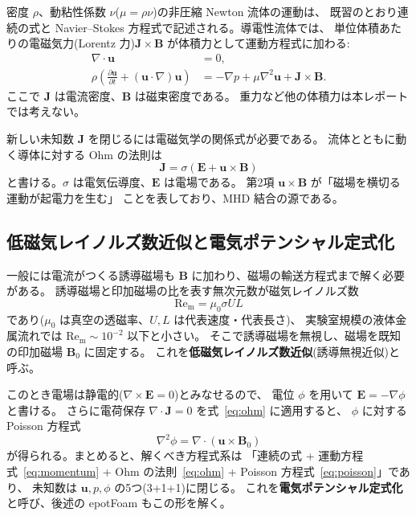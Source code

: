 \documentclass{ltjsarticle}   %
\newcommand{\Rm}{\mathrm{Re}_\mathrm{m}}
\begin{document}
密度 $\rho$、動粘性係数 $\nu$($\mu=\rho\nu$)の非圧縮 Newton 流体の運動は、
既習のとおり連続の式と Navier--Stokes 方程式で記述される。導電性流体では、
単位体積あたりの電磁気力(Lorentz 力)$\boldsymbol{J}\times\boldsymbol{B}$
が体積力として運動方程式に加わる:
\begin{align}
  \nabla\cdot\boldsymbol{u} &= 0, \\
  \rho\left(\frac{\partial \boldsymbol{u}}{\partial t}
    + (\boldsymbol{u}\cdot\nabla)\boldsymbol{u}\right)
  &= -\nabla p + \mu\nabla^2\boldsymbol{u}
    + \boldsymbol{J}\times\boldsymbol{B}.
  \label{eq:momentum}
\end{align}
ここで $\boldsymbol{J}$ は電流密度、$\boldsymbol{B}$ は磁束密度である。
重力など他の体積力は本レポートでは考えない。

新しい未知数 $\boldsymbol{J}$ を閉じるには電磁気学の関係式が必要である。
流体とともに動く導体に対する Ohm の法則は
\begin{equation}
  \boldsymbol{J} = \sigma\left(\boldsymbol{E} + \boldsymbol{u}\times\boldsymbol{B}\right)
  \label{eq:ohm}
\end{equation}
と書ける。$\sigma$ は電気伝導度、$\boldsymbol{E}$ は電場である。
第2項 $\boldsymbol{u}\times\boldsymbol{B}$ が「磁場を横切る運動が起電力を生む」
ことを表しており、MHD 結合の源である。

\subsection{低磁気レイノルズ数近似と電気ポテンシャル定式化}

一般には電流がつくる誘導磁場も $\boldsymbol{B}$ に加わり、磁場の輸送方程式まで解く必要がある。
誘導磁場と印加磁場の比を表す無次元数が磁気レイノルズ数
\begin{equation}
  \Rm = \mu_0 \sigma U L
\end{equation}
であり($\mu_0$ は真空の透磁率、$U,L$ は代表速度・代表長さ)、
実験室規模の液体金属流れでは $\Rm \sim 10^{-2}$ 以下と小さい。
そこで誘導磁場を無視し、磁場を既知の印加磁場 $\boldsymbol{B}_0$ に固定する。
これを\textbf{低磁気レイノルズ数近似}(誘導無視近似)と呼ぶ。

このとき電場は静電的($\nabla\times\boldsymbol{E}=0$)とみなせるので、
電位 $\phi$ を用いて $\boldsymbol{E}=-\nabla\phi$ と書ける。
さらに電荷保存 $\nabla\cdot\boldsymbol{J}=0$ を式~\eqref{eq:ohm} に適用すると、
$\phi$ に対する Poisson 方程式
\begin{equation}
  \nabla^2\phi = \nabla\cdot(\boldsymbol{u}\times\boldsymbol{B}_0)
  \label{eq:poisson}
\end{equation}
が得られる。まとめると、解くべき方程式系は
「連続の式 + 運動方程式~\eqref{eq:momentum} + Ohm の法則~\eqref{eq:ohm}
+ Poisson 方程式~\eqref{eq:poisson}」であり、
未知数は $\boldsymbol{u}, p, \phi$ の5つ(3+1+1)に閉じる。
これを\textbf{電気ポテンシャル定式化}と呼び、後述の epotFoam もこの形を解く。
\end{document}
